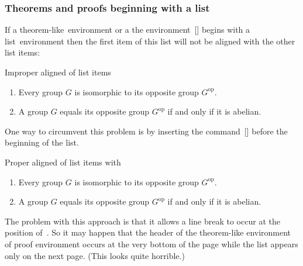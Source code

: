 \subsubsection{Theorems and proofs beginning with a list}

If a theorem-like~environment or a the environment~[\envname] begins with a list~environment then the first item of this list will not be aligned with the other list items:
\begin{showlatex}{Improper aligned of list items}
\begin{lemma}
\begin{enumerate}
  \item
    Every group $G$ is isomorphic to its opposite group $G^{\mathrm{op}}$.
  \item
    A group $G$ equals its opposite group $G^{\mathrm{op}}$ if and only if it is abelian.
\end{enumerate}
\end{lemma}
\end{showlatex}

One way to circumvent this problem is by inserting the command~[\comname] before the beginning of the list.
\begin{showlatex}{Proper aligned of list items with~}
\begin{lemma}
\leavevmode
\begin{enumerate}
  \item
    Every group $G$ is isomorphic to its opposite group $G^{\mathrm{op}}$.
  \item
    A group $G$ equals its opposite group $G^{\mathrm{op}}$ if and only if it is abelian.
\end{enumerate}
\end{lemma}
\end{showlatex}
The problem with this approach is that it allows a line break to occur at the position of~.
So it may happen that the header of the theorem-like environment of proof environment occurs at the very bottom of the page while the list appears only on the next page.
(This looks quite horrible.)

